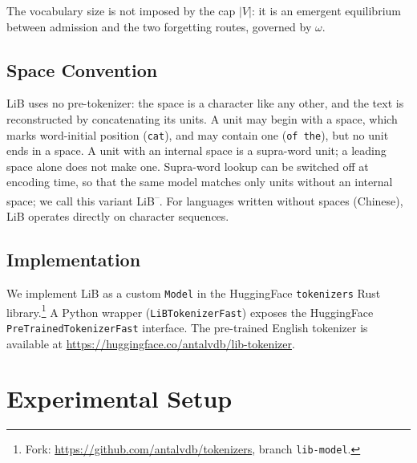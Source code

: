 \documentclass[pdflatex,sn-apa]{sn-jnl}
\begin{document}
The vocabulary size is not imposed by the cap $|V|$: it is an
emergent equilibrium between admission and the two forgetting routes, governed
by $\omega$.



\subsection{Space Convention}

LiB uses no pre-tokenizer: the space is a character like any other, and
the text is reconstructed by concatenating its units.
A unit may begin with a space, which marks word-initial position
(\texttt{\textvisiblespace cat}), and may contain one
(\texttt{\textvisiblespace of the}), but no unit ends in a space.
A unit with an internal space is a supra-word unit; a leading space alone
does not make one.
Supra-word lookup can be switched off at encoding time, so that the same
model matches only units without an internal space; we call this variant
LiB\textsuperscript{--}.
For languages written without spaces (Chinese), LiB operates directly on
character sequences.

\subsection{Implementation}

We implement LiB as a custom \texttt{Model} in the HuggingFace
\texttt{tokenizers} Rust
library.\footnote{Fork: \url{https://github.com/antalvdb/tokenizers}, branch
\texttt{lib-model}.}
A Python wrapper (\texttt{LiBTokenizerFast}) exposes the HuggingFace
\texttt{PreTrainedTokenizerFast} interface.
The pre-trained English tokenizer is available at
\url{https://huggingface.co/antalvdb/lib-tokenizer}.


\section{Experimental Setup}
\label{sec:setup}
\end{document}
